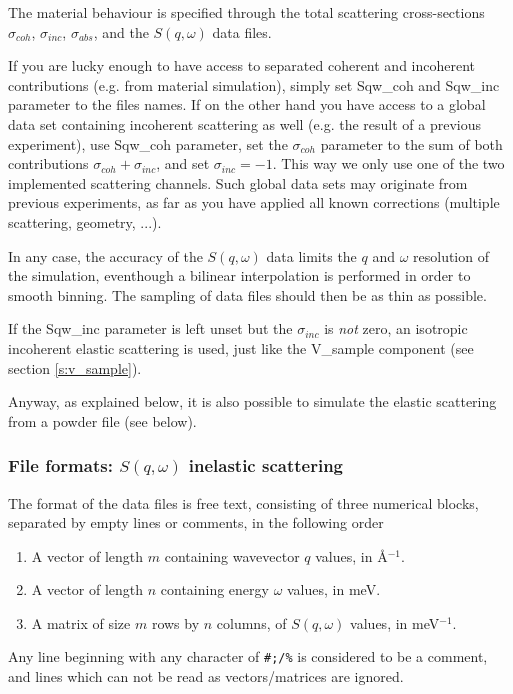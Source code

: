 The material behaviour is specified through the total scattering cross-sections $\sigma_{coh}$, $\sigma_{inc}$, $\sigma_{abs}$, and the $S(q, \omega)$ data files.

If you are lucky enough to have access to separated coherent and incoherent contributions (e.g. from material simulation), simply set Sqw\_coh and Sqw\_inc parameter to the files names. If on the other hand you have access to a global data set containing incoherent scattering as well (e.g. the result of a previous experiment), use Sqw\_coh parameter, set the $\sigma_{coh}$ parameter to the sum of both contributions $\sigma_{coh}+\sigma_{inc}$, and set $\sigma_{inc}=-1$. This way we only use one of the two implemented  scattering channels. Such global data sets may originate from previous experiments, as far as you have applied all known corrections (multiple scattering, geometry, ...).

In any case, the accuracy of the $S(q, \omega)$ data limits the $q$ and $\omega$ resolution of the simulation, eventhough a bilinear interpolation is performed in order to smooth binning. The sampling of data files should then be as thin as possible.

If the Sqw\_inc parameter is left unset but the $\sigma_{inc}$ is \emph{not} zero, an isotropic incoherent elastic scattering is used, just like the V\_sample component (see section \ref{s:v_sample}).

Anyway, as explained below, it is also possible to simulate the elastic scattering from a powder file (see below).

\subsubsection{File formats: $S(q,\omega)$ inelastic scattering}

The format of the data files is free text, consisting of three numerical blocks, separated by empty lines or comments, in the following order
\begin{enumerate}
\item A vector of length $m$ containing wavevector $q$ values, in \AA$^{-1}$.
\item A vector of length $n$ containing energy $\omega$ values, in meV.
\item A matrix of size $m$ rows by $n$ columns, of $S(q, \omega)$ values, in meV$^{-1}$.
\end{enumerate}
Any line beginning with any character of \verb+#;/%+ is considered to be a comment, and lines which can not be read as vectors/matrices are ignored.

